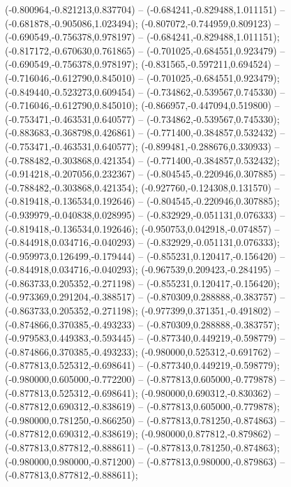  (-0.800964,-0.821213,0.837704) -- (-0.684241,-0.829488,1.011151) -- (-0.681878,-0.905086,1.023494);
 (-0.807072,-0.744959,0.809123) -- (-0.690549,-0.756378,0.978197) -- (-0.684241,-0.829488,1.011151);
 (-0.817172,-0.670630,0.761865) -- (-0.701025,-0.684551,0.923479) -- (-0.690549,-0.756378,0.978197);
 (-0.831565,-0.597211,0.694524) -- (-0.716046,-0.612790,0.845010) -- (-0.701025,-0.684551,0.923479);
 (-0.849440,-0.523273,0.609454) -- (-0.734862,-0.539567,0.745330) -- (-0.716046,-0.612790,0.845010);
 (-0.866957,-0.447094,0.519800) -- (-0.753471,-0.463531,0.640577) -- (-0.734862,-0.539567,0.745330);
 (-0.883683,-0.368798,0.426861) -- (-0.771400,-0.384857,0.532432) -- (-0.753471,-0.463531,0.640577);
 (-0.899481,-0.288676,0.330933) -- (-0.788482,-0.303868,0.421354) -- (-0.771400,-0.384857,0.532432);
 (-0.914218,-0.207056,0.232367) -- (-0.804545,-0.220946,0.307885) -- (-0.788482,-0.303868,0.421354);
 (-0.927760,-0.124308,0.131570) -- (-0.819418,-0.136534,0.192646) -- (-0.804545,-0.220946,0.307885);
 (-0.939979,-0.040838,0.028995) -- (-0.832929,-0.051131,0.076333) -- (-0.819418,-0.136534,0.192646);
 (-0.950753,0.042918,-0.074857) -- (-0.844918,0.034716,-0.040293) -- (-0.832929,-0.051131,0.076333);
 (-0.959973,0.126499,-0.179444) -- (-0.855231,0.120417,-0.156420) -- (-0.844918,0.034716,-0.040293);
 (-0.967539,0.209423,-0.284195) -- (-0.863733,0.205352,-0.271198) -- (-0.855231,0.120417,-0.156420);
 (-0.973369,0.291204,-0.388517) -- (-0.870309,0.288888,-0.383757) -- (-0.863733,0.205352,-0.271198);
 (-0.977399,0.371351,-0.491802) -- (-0.874866,0.370385,-0.493233) -- (-0.870309,0.288888,-0.383757);
 (-0.979583,0.449383,-0.593445) -- (-0.877340,0.449219,-0.598779) -- (-0.874866,0.370385,-0.493233);
 (-0.980000,0.525312,-0.691762) -- (-0.877813,0.525312,-0.698641) -- (-0.877340,0.449219,-0.598779);
 (-0.980000,0.605000,-0.772200) -- (-0.877813,0.605000,-0.779878) -- (-0.877813,0.525312,-0.698641);
 (-0.980000,0.690312,-0.830362) -- (-0.877812,0.690312,-0.838619) -- (-0.877813,0.605000,-0.779878);
 (-0.980000,0.781250,-0.866250) -- (-0.877813,0.781250,-0.874863) -- (-0.877812,0.690312,-0.838619);
 (-0.980000,0.877812,-0.879862) -- (-0.877813,0.877812,-0.888611) -- (-0.877813,0.781250,-0.874863);
 (-0.980000,0.980000,-0.871200) -- (-0.877813,0.980000,-0.879863) -- (-0.877813,0.877812,-0.888611);
